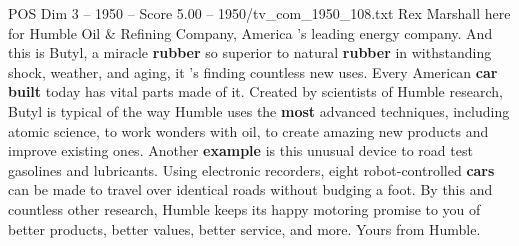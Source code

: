 \begin{textsample}{POS Dim 3 – 1950 – Score 5.00 – 1950/tv\_com\_1950\_108.txt}  \label{ex:f3_pos_010}
Rex Marshall here for Humble Oil \& Refining Company, America 's leading energy company.
And this is Butyl, a miracle \textbf{rubber} so superior to natural \textbf{rubber} in withstanding shock, weather, and aging, it 's finding countless new uses.
Every American \textbf{car} \textbf{built} today has vital parts made of it.
Created by scientists of Humble research, Butyl is typical of the way Humble uses the \textbf{most} advanced techniques, including atomic science, to work wonders with oil, to create amazing new products and improve existing ones.
Another \textbf{example} is this unusual device to road test gasolines and lubricants.
Using electronic recorders, eight robot-controlled \textbf{cars} can be made to travel over identical roads without budging a foot.
By this and countless other research, Humble keeps its happy motoring promise to you of better products, better values, better service, and more.
Yours from Humble.

\end{textsample}

